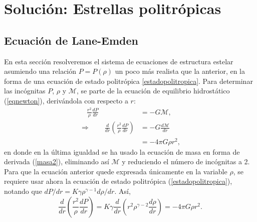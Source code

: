 \section{Solución: Estrellas politrópicas}
\subsection{Ecuación de Lane-Emden}
En esta sección resolveremos el sistema de ecuaciones de estructura estelar asumiendo una relación $P=P(\rho)$ un poco más realista que la anterior, en la forma de una ecuación de estado politrópica \eqref{estadopolitropica}. Para determinar las incógnitas $P$, $\rho$ y $\mathcal{M}$, se parte de la ecuación de equilibrio hidrostático (\ref{eqnewton}), derivándola con respecto a $r$:
\begin{align}
\quad\frac{r^2}{\rho}\frac{dP}{dr}&=-G\mathcal{M},\quad\\
\Rightarrow\qquad\frac{d}{dr}\left(\frac{r^2}{\rho}\frac{dP}{dr}\right)&=-G\frac{d\mathcal{M}}{dr}\\
&=-4\pi G\rho r^2,\label{eq-hidrostatico-sinm}
\end{align}
en donde en la última igualdad se ha usado la ecuación de masa en forma de derivada (\ref{masa2}), eliminando así $\mathcal{M}$ y reduciendo el número de incógnitas a 2. Para que la ecuación anterior quede expresada únicamente en la variable $\rho$, se requiere usar ahora la ecuación de estado politrópica (\ref{estadopolitropica}), notando que ${dP}/{dr}=K\gamma\rho^{\gamma-1}d\rho/dr$. Así,
\begin{equation}\label{laneprevia}
 \frac{d}{dr}\left(\frac{r^2}{\rho}\frac{dP}{dr}\right)=K\gamma\frac{d}{dr}\left(r^2\rho^{\gamma-2}\frac{d\rho}{dr}\right)=-4\pi G\rho r^2.
\end{equation}

